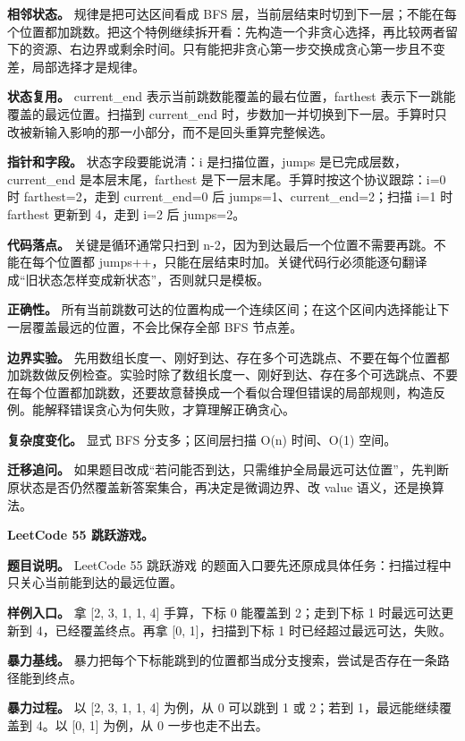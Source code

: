 \textbf{相邻状态。} 规律是把可达区间看成 BFS 层，当前层结束时切到下一层；不能在每个位置都加跳数。把这个特例继续拆开看：先构造一个非贪心选择，再比较两者留下的资源、右边界或剩余时间。只有能把非贪心第一步交换成贪心第一步且不变差，局部选择才是规律。

\textbf{状态复用。} current\_end 表示当前跳数能覆盖的最右位置，farthest 表示下一跳能覆盖的最远位置。扫描到 current\_end 时，步数加一并切换到下一层。手算时只改被新输入影响的那一小部分，而不是回头重算完整候选。

\textbf{指针和字段。} 状态字段要能说清：i 是扫描位置，jumps 是已完成层数，current\_end 是本层末尾，farthest 是下一层末尾。手算时按这个协议跟踪：i=0 时 farthest=2，走到 current\_end=0 后 jumps=1、current\_end=2；扫描 i=1 时 farthest 更新到 4，走到 i=2 后 jumps=2。

\textbf{代码落点。} 关键是循环通常只扫到 n-2，因为到达最后一个位置不需要再跳。不能在每个位置都 jumps++，只能在层结束时加。关键代码行必须能逐句翻译成“旧状态怎样变成新状态”，否则就只是模板。

\textbf{正确性。} 所有当前跳数可达的位置构成一个连续区间；在这个区间内选择能让下一层覆盖最远的位置，不会比保存全部 BFS 节点差。

\textbf{边界实验。} 先用数组长度一、刚好到达、存在多个可选跳点、不要在每个位置都加跳数做反例检查。实验时除了数组长度一、刚好到达、存在多个可选跳点、不要在每个位置都加跳数，还要故意替换成一个看似合理但错误的局部规则，构造反例。能解释错误贪心为何失败，才算理解正确贪心。

\textbf{复杂度变化。} 显式 BFS 分支多；区间层扫描 O(n) 时间、O(1) 空间。

\textbf{迁移追问。} 如果题目改成“若问能否到达，只需维护全局最远可达位置”，先判断原状态是否仍然覆盖新答案集合，再决定是微调边界、改 value 语义，还是换算法。

\noindent\textbf{LeetCode 55 跳跃游戏。}

\textbf{题目说明。} LeetCode 55 跳跃游戏 的题面入口要先还原成具体任务：扫描过程中只关心当前能到达的最远位置。

\textbf{样例入口。} 拿 [2, 3, 1, 1, 4] 手算，下标 0 能覆盖到 2；走到下标 1 时最远可达更新到 4，已经覆盖终点。再拿 [0, 1]，扫描到下标 1 时已经超过最远可达，失败。

\textbf{暴力基线。} 暴力把每个下标能跳到的位置都当成分支搜索，尝试是否存在一条路径能到终点。

\textbf{暴力过程。} 以 [2, 3, 1, 1, 4] 为例，从 0 可以跳到 1 或 2；若到 1，最远能继续覆盖到 4。以 [0, 1] 为例，从 0 一步也走不出去。


